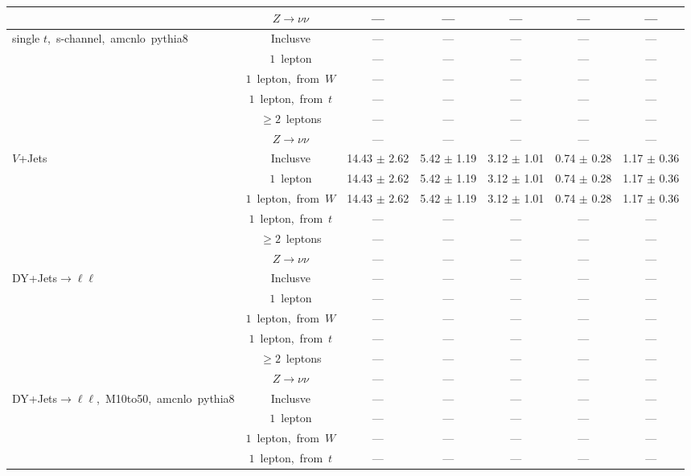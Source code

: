 \documentclass{article}
\begin{document}
\begin{longtable}{|l|c|c|c|c|c|c|}
 & $Z\rightarrow\nu\nu$  & ---  & ---  & ---  & ---  & --- \\* 
\hline 
\multirow{6}{*}{single $t$,~s-channel,~amcnlo~pythia8} & Inclusve  & ---  & ---  & ---  & ---  & --- \\* 
 & $1$~lepton  & ---  & ---  & ---  & ---  & --- \\* 
 & $1$~lepton,~from~$W$  & ---  & ---  & ---  & ---  & --- \\* 
 & $1$~lepton,~from~$t$  & ---  & ---  & ---  & ---  & --- \\* 
 & $\ge2$~leptons  & ---  & ---  & ---  & ---  & --- \\* 
 & $Z\rightarrow\nu\nu$  & ---  & ---  & ---  & ---  & --- \\* 
\hline 
\multirow{6}{*}{$V$+Jets} & Inclusve  & 14.43 $\pm$ 2.62  & 5.42 $\pm$ 1.19  & 3.12 $\pm$ 1.01  & 0.74 $\pm$ 0.28  & 1.17 $\pm$ 0.36 \\* 
 & $1$~lepton  & 14.43 $\pm$ 2.62  & 5.42 $\pm$ 1.19  & 3.12 $\pm$ 1.01  & 0.74 $\pm$ 0.28  & 1.17 $\pm$ 0.36 \\* 
 & $1$~lepton,~from~$W$  & 14.43 $\pm$ 2.62  & 5.42 $\pm$ 1.19  & 3.12 $\pm$ 1.01  & 0.74 $\pm$ 0.28  & 1.17 $\pm$ 0.36 \\* 
 & $1$~lepton,~from~$t$  & ---  & ---  & ---  & ---  & --- \\* 
 & $\ge2$~leptons  & ---  & ---  & ---  & ---  & --- \\* 
 & $Z\rightarrow\nu\nu$  & ---  & ---  & ---  & ---  & --- \\* 
\hline 
\multirow{6}{*}{DY+Jets$\rightarrow\ell\ell$} & Inclusve  & ---  & ---  & ---  & ---  & --- \\* 
 & $1$~lepton  & ---  & ---  & ---  & ---  & --- \\* 
 & $1$~lepton,~from~$W$  & ---  & ---  & ---  & ---  & --- \\* 
 & $1$~lepton,~from~$t$  & ---  & ---  & ---  & ---  & --- \\* 
 & $\ge2$~leptons  & ---  & ---  & ---  & ---  & --- \\* 
 & $Z\rightarrow\nu\nu$  & ---  & ---  & ---  & ---  & --- \\* 
\hline 
\multirow{6}{*}{DY+Jets$\rightarrow\ell\ell$,~M10to50,~amcnlo~pythia8} & Inclusve  & ---  & ---  & ---  & ---  & --- \\* 
 & $1$~lepton  & ---  & ---  & ---  & ---  & --- \\* 
 & $1$~lepton,~from~$W$  & ---  & ---  & ---  & ---  & --- \\* 
 & $1$~lepton,~from~$t$  & ---  & ---  & ---  & ---  & --- \\* 

\end{longtable}
\end{document}
